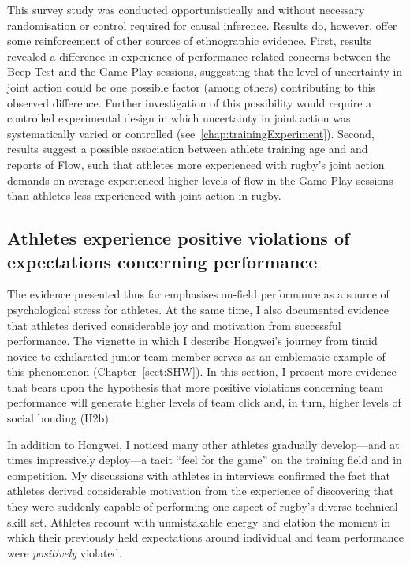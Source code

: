 \begin{CJK}{UTF8}{gbsn}

This survey study was conducted opportunistically and without necessary randomisation or control required for causal inference.  Results do, however, offer some reinforcement of other sources of ethnographic evidence.  First, results revealed a difference in experience of performance-related concerns between the Beep Test and the Game Play sessions, suggesting that the level of uncertainty in joint action could be one possible factor (among others) contributing to this observed difference.  Further investigation of this possibility would require a controlled experimental design in which uncertainty in joint action was systematically varied or controlled (see~\ref{chap:trainingExperiment}).  Second, results suggest a possible association between athlete training age and and reports of Flow, such that athletes more experienced with rugby's joint action demands on average experienced higher levels of flow in the Game Play sessions than athletes less experienced with joint action in rugby.




\subsection{Athletes experience positive violations of expectations concerning performance\label{sect:expectationViolation}}
The evidence presented thus far emphasises on-field performance as a source of psychological stress for athletes.  At the same time, I also documented evidence that athletes derived considerable joy and motivation from successful performance.  The vignette in which I describe Hongwei's journey from timid novice to exhilarated junior team member serves as an emblematic example of this phenomenon (Chapter~\ref{sect:SHW}).  In this section, I present more evidence that bears upon the hypothesis that more positive violations concerning team performance will generate higher levels of team click and, in turn, higher levels of social bonding (H2b).

In addition to Hongwei, I noticed many other athletes gradually develop---and at times impressively deploy---a tacit ``feel for the game'' on the training field and in competition.  My discussions with athletes in interviews confirmed the fact that athletes derived considerable motivation from the experience of discovering that they were suddenly capable of performing one aspect of rugby's diverse technical skill set.  Athletes recount with unmistakable energy and elation the moment in which their previously held expectations around individual and team performance were \textit{positively} violated.


\end{CJK}

